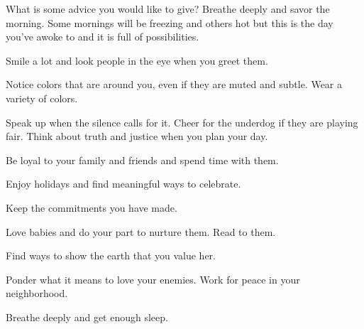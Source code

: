 What is some advice you would like to give?
Breathe deeply and savor the morning.
Some mornings will be freezing and others hot but this is the day you've awoke to and it is full of possibilities.

Smile a lot and look people in the eye when you greet them.

Notice colors that are around you, even if they are muted and subtle.
Wear a variety of colors.

Speak up when the silence calls for it.
Cheer for the underdog if they are playing fair.
Think about truth and justice when you plan your day.

Be loyal to your family and friends and spend time with them.

Enjoy holidays and find meaningful ways to celebrate.

Keep the commitments you have made.

Love babies and do your part to nurture them.
Read to them.

Find ways to show the earth that you value her.

Ponder what it means to love your enemies.
Work for peace in your neighborhood.

Breathe deeply and get enough sleep.







